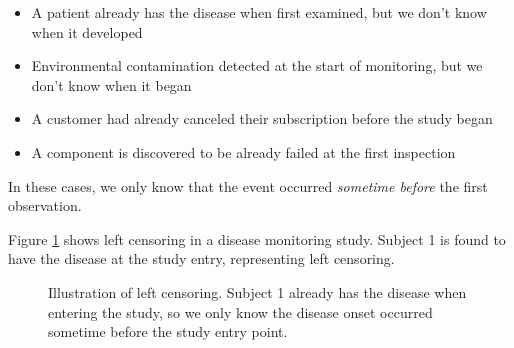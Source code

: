 \begin{examplebox}[title=Examples of Left Censoring]
\begin{itemize}
    \item A patient already has the disease when first examined, but we don't know when it developed
    \item Environmental contamination detected at the start of monitoring, but we don't know when it began
    \item A customer had already canceled their subscription before the study began
    \item A component is discovered to be already failed at the first inspection
\end{itemize}

In these cases, we only know that the event occurred \textit{sometime before} the first observation.
\end{examplebox}

Figure \ref{fig:left-censoring} shows left censoring in a disease monitoring study. Subject 1 is found to have the disease at the study entry, representing left censoring.

\begin{figure}[htbp]
    \centering
    \caption{Illustration of left censoring. Subject 1 already has the disease when entering the study, so we only know the disease onset occurred sometime before the study entry point.}
    \label{fig:left-censoring}
\end{figure}

